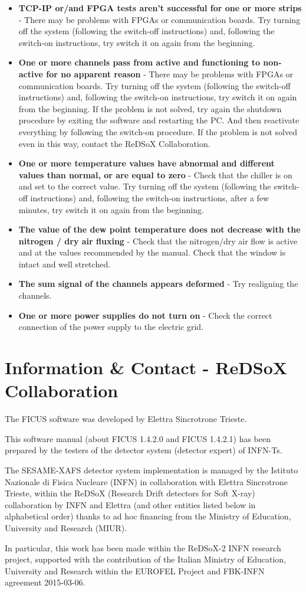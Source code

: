 \documentclass[a4paper,12pt,oneside,pdflatex,italian,final,twocolumn]{article}
\begin{document}
\begin{itemize}
    \item \textbf{TCP-IP or/and FPGA tests aren't successful for one or more strips} - There may be problems with FPGAs or communication boards. Try turning off the system (following the switch-off instructions) and, following the switch-on instructions, try switch it on again from the beginning.
    \item \textbf{One or more channels pass from active and functioning to non-active for no apparent reason } - There may be problems with FPGAs or communication boards. Try turning off the system (following the switch-off instructions) and, following the switch-on instructions, try switch it on again from the beginning. If the problem is not solved, try again the shutdown procedure by exiting the software and restarting the PC. And then reactivate everything by following the switch-on procedure. If the problem is not solved even in this way, contact the ReDSoX Collaboration.
    \item \textbf{One or more temperature values have abnormal and different values than normal, or are equal to zero} - Check that the chiller is on and set to the correct value. Try turning off the system (following the switch-off instructions) and, following the switch-on instructions, after a few minutes, try switch it on again from the beginning.
    \item \textbf{The value of the dew point temperature does not decrease with the nitrogen / dry air fluxing} - Check that the nitrogen/dry air flow is active and at the values recommended by the manual. Check that the window is intact and well stretched.
    \item \textbf{The sum signal of the channels appears deformed} - Try realigning the channels.
    \item \textbf{One or more power supplies do not turn on} - Check the correct connection of the power supply to the electric grid.
\end{itemize}

\section{Information \& Contact - ReDSoX Collaboration}
        The FICUS software was developed by Elettra Sincrotrone Trieste.
        
        This software manual (about FICUS 1.4.2.0 and FICUS 1.4.2.1) has been prepared by the testers of the detector system (detector expert) of INFN-Ts.
        
        The SESAME-XAFS detector system implementation is managed by the Istituto Nazionale di Fisica Nucleare (INFN) in collaboration with Elettra Sincrotrone Trieste, within the ReDSoX (Research Drift detectors for Soft X-ray) collaboration by INFN and Elettra (and other entities listed below in alphabetical order) thanks to ad hoc financing from the Ministry of Education, University and Research (MIUR).
	
        In particular, this work has been made within the ReDSoX-2 INFN research project, supported with the contribution of the Italian Ministry of Education, University and Research within the EUROFEL Project and FBK-INFN agreement 2015-03-06.
	
\end{document}
